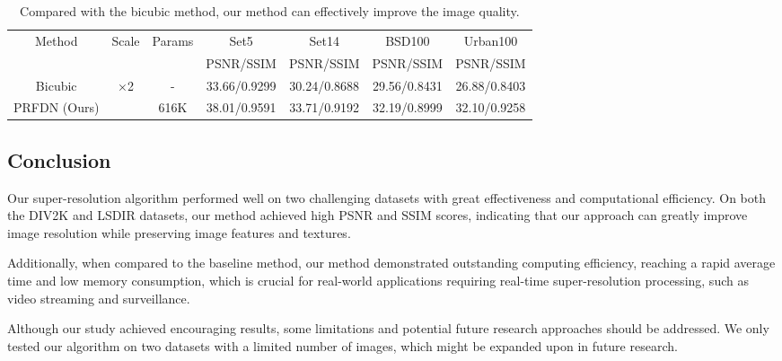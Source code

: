 \documentclass[10pt,twocolumn,letterpaper]{article}
\begin{document}
\begin{table}[t]
    \caption{Compared with the bicubic method, our method can effectively improve the image quality.}
    \resizebox{\columnwidth}{!}
    {
        \begin{tabular}{|c|c|c|c|c|c|c|}
        \hline
        \multirow{2}{*}{Method} & \multirow{2}{*}{Scale} & \multirow{2}{*}{Params} & Set5  & Set14 & BSD100 & Urban100 \\
    \cline{4-7}          &       &       & PSNR/SSIM & PSNR/SSIM & PSNR/SSIM & PSNR/SSIM  \\
        \hline
        Bicubic & \multirow{2}[2]{*}{×2} & -     & 33.66/0.9299 & 30.24/0.8688 & 29.56/0.8431 & 26.88/0.8403  \\
        PRFDN (Ours) &       & 616K  & 38.01/0.9591 & 33.71/0.9192 & 32.19/0.8999 & 32.10/0.9258 \\
        \hline
        \end{tabular}%
    }
    \label{tab-quality}
\end{table}%


\subsection{Conclusion}
Our super-resolution algorithm performed well on two challenging datasets with great effectiveness and computational efficiency. On both the DIV2K and LSDIR datasets, our method achieved high PSNR and SSIM scores, indicating that our approach can greatly improve image resolution while preserving image features and textures.

Additionally, when compared to the baseline method, our method demonstrated outstanding computing efficiency, reaching a rapid average time and low memory consumption, which is crucial for real-world applications requiring real-time super-resolution processing, such as video streaming and surveillance.

Although our study achieved encouraging results, some limitations and potential future research approaches should be addressed. We only tested our algorithm on two datasets with a limited number of images, which might be expanded upon in future research.

{\small


}
\end{document}
